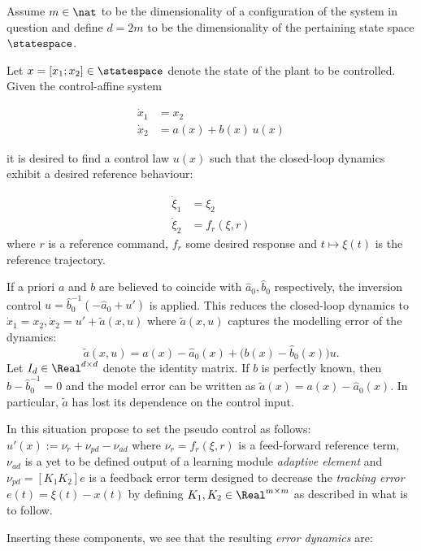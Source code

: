 Assume $m \in \nat$ to be the dimensionality of a configuration of the system in question and define $d = 2m$ to be the dimensionality of the pertaining state space $\statespace$.

Let $x = [x_1;x_2] \in \statespace$ denote the state of the plant to be controlled.
Given the control-affine system 
 
\begin{align}
\dot x_1 &= x_2 \\
\dot x_2 &= a(x) + b(x) \, u(x) \label{eq:secorddynctrlaff}
\end{align}

it is desired to find a control law $u(x)$ such that the closed-loop dynamics exhibit a desired reference behaviour:

\begin{align}
\dot \xi_1 &= \xi_2 \\
\dot \xi_2 &= f_{r}(\xi,r)
\end{align}
where $r$ is a reference command, $f_r$ some desired response and $t \mapsto \xi (t)$ is the reference trajectory.

If a priori $a$ and $b$ are believed to coincide with $\hat a_0, \hat b_0$ respectively, the inversion control 
$u = \hat b_0^{-1} (- \hat a_0 +u')$ is applied. This reduces the closed-loop dynamics to 
$\dot x_1 = x_2, \dot x_2 = u' + \tilde a(x,u) $
where $\tilde a(x,u)$ captures the modelling error of the dynamics: 
\begin{equation}
	\tilde a (x,u ) = a(x) - \hat a_0(x) + \bigl(b(x) - \hat b_0(x)\bigr) u.
\end{equation}
 Let $I_d \in \Real^{d \times d}$ denote the identity matrix.  If $b$ is perfectly known, then $b - \hat b_0^{-1} = 0$ and the model error can be written as $\tilde a (x)= a(x) - \hat a_0(x)$. In particular, $\tilde a$ has lost its dependence on the control input. 



In this situation \cite{Chowdhary2013,ChowdharyCDC2013} propose to set 
the pseudo control as follows: $u'(x) :=  \nu_{r} + \nu_{pd} - \nu_{ad}$ where $\nu_{r} = f_{r}(\xi,r)$ is a feed-forward reference term,  $\nu_{ad}$ is a yet to be defined output of a learning module \emph{adaptive element} and $\nu_{pd} = [K_1 K_2] e$ is a feedback error term designed to decrease the \textit{tracking error} $e(t) = \xi(t) - x(t)$ by defining $K_1,K_2 \in \Real^{m \times m}$ as described in what is to follow.

Inserting these components, we see that the resulting \textit{error dynamics} are:


